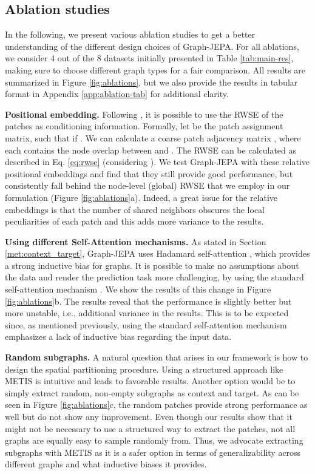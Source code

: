 \documentclass{article} \usepackage{iclr2024_conference,times}
\begin{document}
\subsection{Ablation studies}
In the following, we present various ablation studies to get a better understanding of the different design choices of Graph-JEPA. For all ablations, we consider 4 out of the 8 datasets initially presented in Table \ref{tab:main-res}, making sure to choose different graph types for a fair comparison. All results are summarized in Figure \ref{fig:ablations}, but we also provide the results in tabular format in Appendix \ref{app:ablation-tab} for additional clarity.

\textbf{Positional embedding.} Following \citet{he2023generalization}, it is possible to use the RWSE of the patches as conditioning information. Formally, let  be the patch assignment matrix, such that  if . We can calculate a coarse patch adjacency matrix , where each  contains the node overlap between  and . The RWSE can be calculated as described in Eq. \ref{eq:rwse} (considering ). We test Graph-JEPA with these relative positional embeddings and find that they still provide good performance, but consistently fall behind the node-level (global) RWSE that we employ in our formulation (Figure \ref{fig:ablations}a). Indeed, a great issue for the relative embeddings is that the number of shared neighbors obscures the local peculiarities of each patch and this adds more variance to the results. 

\textbf{Using different Self-Attention mechanisms.} As stated in Section \ref{met:context_target}, Graph-JEPA uses Hadamard self-attention \citep{he2023generalization}, which provides a strong inductive bias for graphs. It is possible to make no assumptions about the data and render the prediction task more challenging, by using the standard self-attention mechanism \citep{vaswani2017attention}. We show the results of this change in Figure \ref{fig:ablations}b. The results reveal that the performance is slightly better but more unstable, i.e., additional variance in the results. This is to be expected since, as mentioned previously, using the standard self-attention mechanism emphasizes a lack of inductive bias regarding the input data.

\textbf{Random subgraphs.} A natural question that arises in our framework is how to design the spatial partitioning procedure. Using a structured approach like METIS is intuitive and leads to favorable results. Another option would be to simply extract random, non-empty subgraphs as context and target. As can be seen in Figure \ref{fig:ablations}c, the random patches provide strong performance as well but do not show any improvement. Even though our results show that it might not be necessary to use a structured way to extract the patches, not all graphs are equally easy to sample randomly from. Thus, we advocate extracting subgraphs with METIS as it is a safer option in terms of generalizability across different graphs and what inductive biases it provides.
\end{document}
